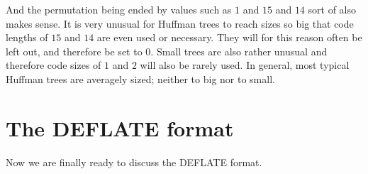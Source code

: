 And the permutation being ended by values such as $1$ and $15$ and
$14$ sort of also makes sense. It is very unusual for Huffman trees to
reach sizes so big that code lengths of $15$ and $14$ are even used or
necessary. They will for this reason often be left out, and therefore
be set to $0$. Small trees are also rather unusual and therefore code
sizes of $1$ and $2$ will also be rarely used. In general, most
typical Huffman trees are averagely sized; neither to big nor to
small.

\section{The DEFLATE format}

Now we are finally ready to discuss the DEFLATE format.

